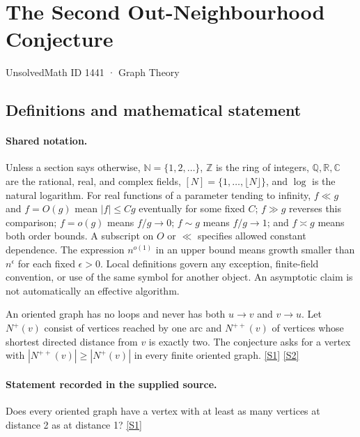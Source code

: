 \documentclass[11pt,a4paper]{article}
\newcommand{\N}{\mathbb{N}}
\newcommand{\Z}{\mathbb{Z}}
\newcommand{\Q}{\mathbb{Q}}
\newcommand{\R}{\mathbb{R}}
\newcommand{\C}{\mathbb{C}}
\newcommand{\sref}[2]{\hyperlink{source:#1:#2}{[S#2]}}
\begin{document}

\setcounter{section}{1440}

\section{The Second Out-Neighbourhood Conjecture}\label{1441}

{\small\sffamily UnsolvedMath ID 1441 · Graph Theory}

\subsection{Definitions and mathematical statement}

\paragraph{Shared notation.}Unless a section says otherwise, $\N=\{1,2,\ldots\}$,
$\Z$ is the ring of integers, $\Q,\R,\C$ are the rational, real, and complex
fields, $[N]=\{1,\ldots,\lfloor N\rfloor\}$, and $\log$ is the natural
logarithm. For real functions of a parameter tending to infinity,
$f\ll g$ and $f=O(g)$ mean $|f|\leq Cg$ eventually for some fixed $C$;
$f\gg g$ reverses this comparison; $f=o(g)$ means $f/g\to0$;
$f\sim g$ means $f/g\to1$; and $f\asymp g$ means both order bounds.
A subscript on $O$ or $\ll$ specifies allowed constant dependence.
The expression $n^{o(1)}$ in an upper bound means growth smaller than
$n^\epsilon$ for each fixed $\epsilon>0$. Local definitions govern any
exception, finite-field convention, or use of the same symbol for another
object. An asymptotic claim is not automatically an effective algorithm.



An oriented graph has no loops and never has both $u\to v$ and $v\to u$. Let $N^+(v)$ consist of vertices reached by one arc and $N^{++}(v)$ of vertices whose shortest directed distance from $v$ is exactly two. The conjecture asks for a vertex with $|N^{++}(v)|\geq|N^+(v)|$ in every finite oriented graph. \sref{1441}{1} \sref{1441}{2}

\paragraph{Statement recorded in the supplied source.}
Does every oriented graph have a vertex with at least as many vertices at distance 2 as at distance 1? \sref{1441}{1}
\end{document}
